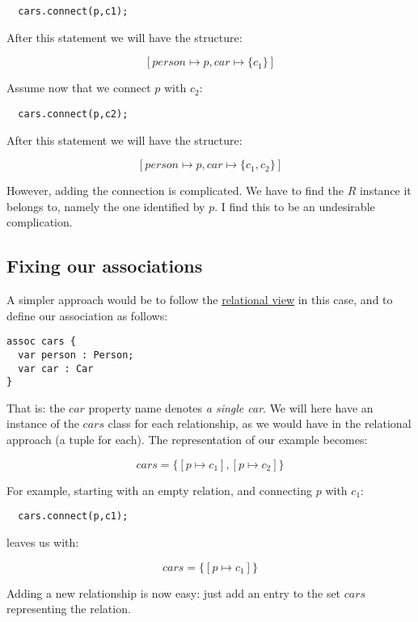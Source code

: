 \documentclass{llncs}
\begin{document}
\sk
\begin{lstlisting}
  cars.connect(p,c1);
\end{lstlisting}

\noindent
After this statement we will have the structure:

\[
[person \mapsto p, car \mapsto \{c_1\}]
\]

\noindent
Assume now that we connect $p$ with $c_2$:

\sk
\begin{lstlisting}
  cars.connect(p,c2);
\end{lstlisting}

\noindent
After this statement we will have the structure:

\[
[person \mapsto p, car \mapsto \{c_1,c_2\}]
\]

\noindent
However, adding the connection is complicated. We have to find the $R$ instance
it belongs to, namely the one identified by $p$. I find this to be
an undesirable complication.

\subsection{Fixing our associations}

A simpler approach would be to follow the \underline{relational view} 
in this case, and to define our association as follows:

\sk
\begin{lstlisting}
assoc cars {
  var person : Person;
  var car : Car
}
\end{lstlisting}

\noindent
That is: the $car$ property name denotes {\em a single car}.
We will here have an instance of the $cars$ class for each relationship,
as we would have in the relational approach (a tuple for each). 
The representation of our example becomes:

\[
cars = \{[p \mapsto c_1],[p \mapsto c_2]\}
\]

\noindent
For example, starting with an empty relation, and connecting $p$ with
$c_1$:

\begin{lstlisting}
  cars.connect(p,c1);
\end{lstlisting}

\noindent
leaves us with:

\[
cars = \{[p \mapsto c_1]\}
\]

\noindent
Adding a new relationship is now easy: just add an entry to the
set $cars$ representing the relation.
\end{document}
